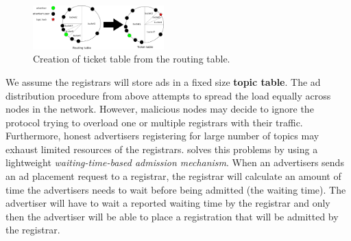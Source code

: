 \begin{figure}
    \includegraphics[width=0.45\textwidth]{img/ticket_table}
    \caption{Creation of ticket table from the routing table.}
    \label{fig:ticket_table}
 \end{figure}
 
  We assume the registrars will store ads in a fixed size \textbf{topic table}. The ad distribution procedure from above attempts to spread the load equally across nodes in the network. 
However, malicious nodes may decide to ignore the protocol trying to overload one or multiple registrars with their traffic. 
Furthermore,  honest advertisers registering for large number of topics may exhaust limited resources of the registrars. 
 \sysname solves this problems by using a lightweight \textit{waiting-time-based admission mechanism}. When an advertisers sends an ad placement request to a registrar, the registrar will calculate an amount of time the advertisers needs to wait before being admitted (\ie the waiting time). 
The advertiser will have to wait a reported waiting time by the registrar and only then the advertiser will be able to place a registration that will be admitted by the registrar.
 
